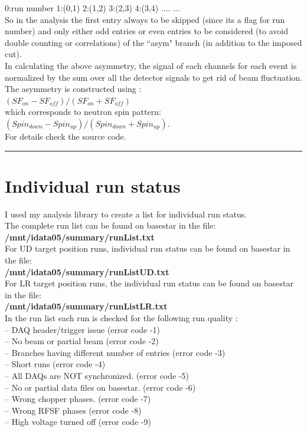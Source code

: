 \documentclass[12pt]{article}
\begin{document}
0:run number 1:(0,1) 2:(1,2) 3:(2,3) 4:(3,4) .... ... \\

So in the analysis the first entry always to be skipped (since its a flag for run number) and only either odd entries or even entries to be considered (to avoid double counting or correlations) of the ``asym" branch (in addition to the imposed cut). \\

In calculating the above asymmetry, the signal of each channels for each event is normalized by the sum over all the detector signals to get rid of beam fluctuation. \\
The asymmetry is constructed using : \\
$(SF_{on} - SF_{off})/(SF_{on} + SF_{off})$ \\
which corresponds to neutron spin pattern: \\
 $(Spin_{down} - Spin_{up})/(Spin_{down} + Spin_{up})$. \\


For details check the source code.

\noindent
{\color{red} \rule{\linewidth}{1mm} }

\newpage
\section{Individual run status}
I used my analysis library to create a list for individual run status. \\

The complete run list can be found on basestar in the file: \\
\textbf{/mnt/idata05/summary/runList.txt } \\

For UD target position runs, individual run status can be found on basestar in the file: \\
\textbf{/mnt/idata05/summary/runListUD.txt } \\

For LR target position runs, the individual run status can be found on basestar in the file: \\
\textbf{/mnt/idata05/summary/runListLR.txt } \\ 

In the run list each run is checked for the following run quality :\\
-- DAQ header/trigger issue (error code -1)\\
-- No beam or partial beam (error code -2)\\
-- Branches having different number of entries (error code -3) \\
-- Short runs (error code -4)\\
-- All DAQs are NOT synchronized. (error code -5)\\
-- No or partial data files on basestar. (error code -6)\\
-- Wrong chopper phases. (error code -7)\\
-- Wrong RFSF phases (error code -8)\\
-- High voltage turned off (error code -9)\\
\end{document}
